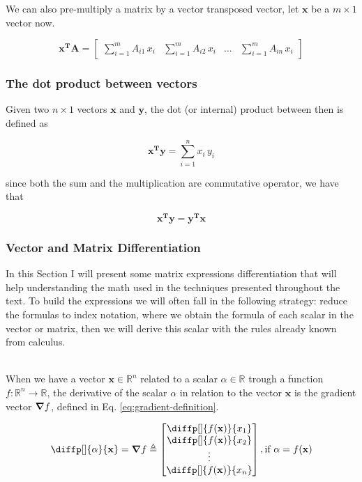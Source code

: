 \documentclass[12pt]{article}
\newcommand{\bvec}[1]{\boldsymbol{\mathbf{#1}}} %
\newcommand{\bvecT}[1]{\boldsymbol{\mathbf{#1^T}}} %
\newcommand{\mat}[1]{\boldsymbol{\mathbf{#1}}}
\newcommand{\Sum}[3][i]{\sum\limits_{#1 = #2}^{#3}}
\newcommand{\R}{\mathbb{R}}
\newcommand{\hsix}[1]{\noindent{\normalsize \textbf{#1}}}
\begin{document}
We can also pre-multiply a matrix by a vector transposed vector, let $\bvec{x}$ be a $m\times 1$ vector now.

\begin{equation}
    \bvecT{x} \mat{A} = \begin{bmatrix}
        \sum\limits_{i = 1}^{m} A_{i1} \, x_i &
        \sum\limits_{i = 1}^{m} A_{i2} \, x_i & \dots &
        \sum\limits_{i = 1}^{m} A_{in} \, x_i
    \end{bmatrix}
    \label{eq:vector-matrix-multiplication}
\end{equation}

\subsubsection{The dot product between vectors}
Given two $n\times 1$ vectors $\bvec{x}$ and $\bvec{y}$, the dot (or internal) product between then is defined as

\begin{equation}
    \bvecT{x}\bvec{y} = \Sum{1}{n} x_i\,y_i
    \label{eq:dot-product}
\end{equation}

since both the sum and the multiplication are commutative operator, we have that

\begin{equation}
    \bvecT{x}\bvec{y} = \bvecT{y}\bvec{x}
\end{equation}
\subsubsection{Vector and Matrix Differentiation}
In this Section I will present some matrix expressions differentiation that will help understanding the math used in the techniques presented throughout the text. To build the expressions we will often fall in the following strategy: reduce the formulas to index notation, where we obtain the formula of each scalar in the vector or matrix, then we will derive this scalar with the rules already known from calculus.

\hsix{The Gradient Vector}\\
When we have a vector $\bvec{x} \in \R^n$ related to a scalar $\alpha \in \R$ trough a function $f: \R^n \to \R$, the derivative of the scalar $\alpha$ in relation to the vector $\bvec{x}$ is the gradient vector $\grad{f}$, defined in Eq. \ref{eq:gradient-definition}.

\renewcommand{\arraystretch}{1.5}
\begin{equation}
    \diffp[]{\alpha}{\bvec{x}} = \grad{f} \triangleq \begin{bmatrix}
        \diffp[]{f(\bvec{x})}{x_1} \\
        \diffp[]{f(\bvec{x})}{x_2} \\
        \vdots \\
        \diffp[]{f(\bvec{x})}{x_n} \\
    \end{bmatrix}, \text{if $\alpha = f(\bvec{x})$}
    \label{eq:gradient-definition}
\end{equation}
\renewcommand{\arraystretch}{1.0}
\end{document}
